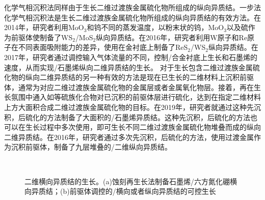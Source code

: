     化学气相沉积法同样由于生长二维过渡族金属硫化物所组成的纵向异质结。一步法化学气相沉积法是生长二维过渡族金属硫化物所组成的纵向异质结的有效方法。在2014年，研究者利用MoO$_3$和钨不同的蒸发温度，以粉末状的钨，MoO$_3$以及硫作为前驱体使制备了WS$_2$/MoS$_2$纵向异质结。在2016年，研究者利用W原子和Re原子在不同表面吸附能力的差异，使用在金衬底上制备了ReS$_2$/WS$_2$纵向异质结。在2017年，研究者通过调控输入气体流量的不同，控制/合金衬底上生长和石墨烯的速度，从而实现/石墨烯纵向二维异质结的生长。
    对于生长包含二维过渡族金属硫化物的纵向二维异质结的另一种有效的方法是现在已生长的二维材料上沉积前驱体，通常为对应二维过渡族金属硫化物的金属层或者金属氧化物层。接着，再在生长氛围中通入如等硫族化合物对已沉积的前驱体层进行硫化，达到在指定二维材料上方大面积合成二维过渡族金属硫化物的目标。在2019年，研究者就通过这种先沉积，后硫化的方法制备了大面积的/石墨烯异质结。这种先沉积，后硫化的方法也可以在生长过程中多次使用，即可生长不同二维过渡族金属硫化物堆叠而成的纵向二维异质结。在2016年，研究者通过多次先沉积，后硫化的方法，使用过渡金属作为沉积前驱体，制备了九层堆叠的/二维纵向异质结。

    \begin{figure}[htb]
        \\[-0.5ex]
        \caption{二维横向异质结的生长。(a)蚀刻再生长法制备石墨烯/六方氮化硼横向异质结；(b)前驱体调控的/横向或者纵向异质结的可控生长}
    \end{figure}

